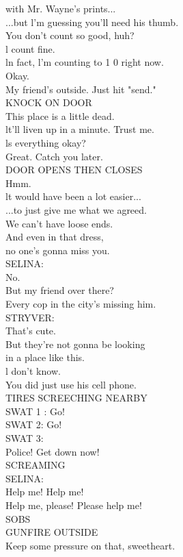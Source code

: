 \documentclass{article}
\begin{document}
\begin{multicols}{3}
with Mr. Wayne's prints...\\
...but l'm guessing you'll need his thumb.\\
You don't count so good, huh?\\
l count fine.\\
ln fact, l'm counting to 1 0 right now.\\
Okay.\\
My friend's outside. Just hit "send."\\
KNOCK ON DOOR\\
This place is a little dead.\\
lt'll liven up in a minute. Trust me.\\
ls everything okay?\\
Great. Catch you later.\\
DOOR OPENS THEN CLOSES\\
Hmm.\\
lt would have been a lot easier...\\
...to just give me what we agreed.\\
We can't have loose ends.\\
And even in that dress,\\
no one's gonna miss you.\\
SELINA:\\
No.\\
But my friend over there?\\
Every cop in the city's missing him.\\
STRYVER:\\
That's cute.\\
But they're not gonna be looking\\
in a place like this.\\
l don't know.\\
You did just use his cell phone.\\
TIRES SCREECHING NEARBY\\
SWAT 1 : Go!\\
SWAT 2: Go!\\
SWAT 3:\\
Police! Get down now!\\
SCREAMING\\
SELINA:\\
Help me! Help me!\\
Help me, please! Please help me!\\
SOBS\\
GUNFIRE OUTSIDE\\
Keep some pressure on that, sweetheart.\\

\end{multicols}
\end{document}
